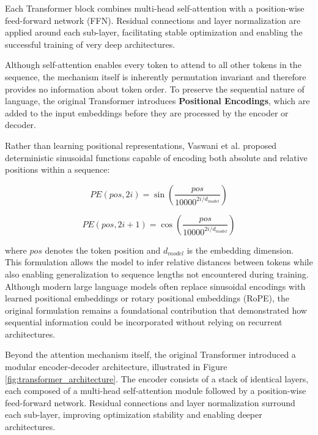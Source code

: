 Each Transformer block combines multi-head self-attention with a position-wise feed-forward network (FFN). Residual connections and layer normalization are applied around each sub-layer, facilitating stable optimization and enabling the successful training of very deep architectures.


Although self-attention enables every token to attend to all other tokens in the sequence, the mechanism itself is inherently permutation invariant and therefore provides no information about token order. To preserve the sequential nature of language, the original Transformer introduces \textbf{Positional Encodings}, which are added to the input embeddings before they are processed by the encoder or decoder.

Rather than learning positional representations, Vaswani et al. proposed deterministic sinusoidal functions capable of encoding both absolute and relative positions within a sequence:

\begin{equation}
PE(pos,2i)=\sin\left(\frac{pos}{10000^{2i/d_{model}}}\right)
\end{equation}

\begin{equation}
PE(pos,2i+1)=\cos\left(\frac{pos}{10000^{2i/d_{model}}}\right)
\end{equation}

where $pos$ denotes the token position and $d_{model}$ is the embedding dimension. This formulation allows the model to infer relative distances between tokens while also enabling generalization to sequence lengths not encountered during training. Although modern large language models often replace sinusoidal encodings with learned positional embeddings or rotary positional embeddings (RoPE), the original formulation remains a foundational contribution that demonstrated how sequential information could be incorporated without relying on recurrent architectures.


Beyond the attention mechanism itself, the original Transformer introduced a modular encoder-decoder architecture, illustrated in Figure \ref{fig:transformer_architecture}. The encoder consists of a stack of identical layers, each composed of a multi-head self-attention module followed by a position-wise feed-forward network. Residual connections and layer normalization surround each sub-layer, improving optimization stability and enabling deeper architectures.

